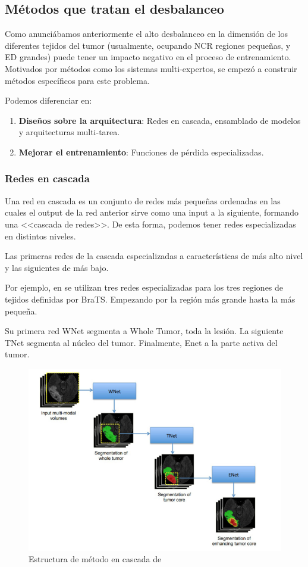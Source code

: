 			
		\subsection{Métodos que tratan el desbalanceo}
		
		Como anunciábamos anteriormente el alto desbalanceo en la dimensión de los diferentes tejidos del tumor (usualmente, ocupando NCR regiones pequeñas, y ED grandes) puede tener un impacto negativo en el proceso de entrenamiento. Motivados por métodos como los sistemas multi-expertos, se empezó a construir métodos específicos para este problema.
		
		Podemos diferenciar en:
		\begin{enumerate}
			\item \textbf{Diseños sobre la arquitectura}: Redes en cascada, ensamblado de modelos y arquitecturas multi-tarea.
			\item \textbf{Mejorar el entrenamiento}: Funciones de pérdida especializadas.
		\end{enumerate}
		
			\subsubsection{Redes en cascada}
			
			Una red en cascada es un conjunto de redes más pequeñas ordenadas en las cuales el output de la red anterior sirve como una input a la siguiente, formando una  <<cascada de redes>>. De esta forma, podemos tener redes especializadas en distintos niveles. 
			
			Las primeras redes de la cascada especializadas a características de más alto nivel y las siguientes de más bajo.
			
			Por ejemplo, en \cite{wang2018automatic} se utilizan tres redes especializadas para los tres regiones de tejidos definidas por BraTS. Empezando por la región más grande hasta la más pequeña. 
			
			Su primera red WNet segmenta a Whole Tumor, toda la lesión. La siguiente TNet segmenta al núcleo del tumor. Finalmente, Enet a la parte activa del tumor.
			
			
			\begin{figure}[!h]
				\centering
				\includegraphics[width=0.5\linewidth]{imagenes/cascadestructure.png}
				\caption{Estructura de método en cascada de \cite{wang2018automatic}}
			\end{figure}
			

